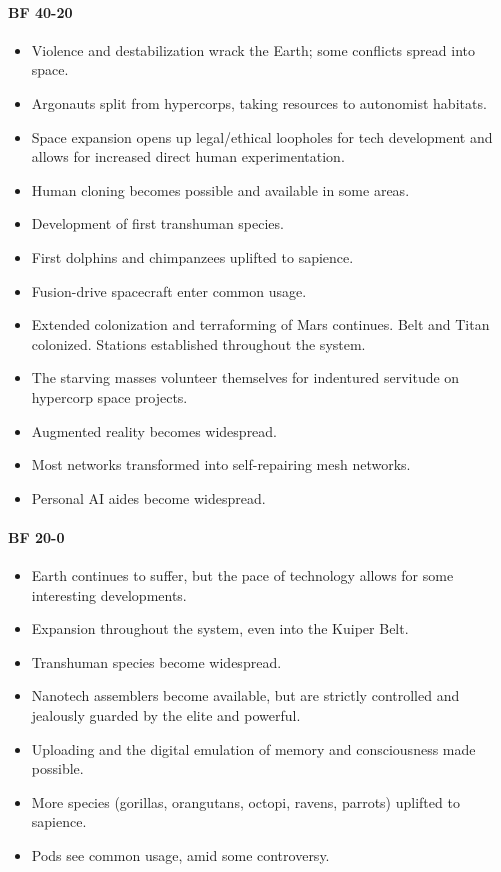 \paragraph{BF 40-20}

\begin{itemize}
\item Violence and destabilization wrack the Earth; some conflicts
  spread into space.
\item Argonauts split from hypercorps, taking resources to autonomist
  habitats.
\item Space expansion opens up legal/ethical loopholes for tech
  development and allows for increased direct human experimentation.
\item Human cloning becomes possible and available in some areas.
\item Development of first transhuman species.
\item First dolphins and chimpanzees uplifted to sapience.
\item Fusion-drive spacecraft enter common usage.
\item Extended colonization and terraforming of Mars continues. Belt
  and Titan colonized.  Stations established throughout the system.
\item The starving masses volunteer themselves for indentured
  servitude on hypercorp space projects.
\item Augmented reality becomes widespread.
\item Most networks transformed into self-repairing mesh networks.
\item Personal AI aides become widespread.
\end{itemize}

\paragraph{ BF 20-0}

\begin{itemize}
\item Earth continues to suffer, but the pace of technology allows for
  some interesting developments.
\item Expansion throughout the system, even into the Kuiper Belt.
\item Transhuman species become widespread.
\item Nanotech assemblers become available, but are strictly
  controlled and jealously guarded by the elite and powerful.
\item Uploading and the digital emulation of memory and consciousness
  made possible.
\item More species (gorillas, orangutans, octopi, ravens, parrots)
  uplifted to sapience.
\item Pods see common usage, amid some controversy.
\end{itemize}

